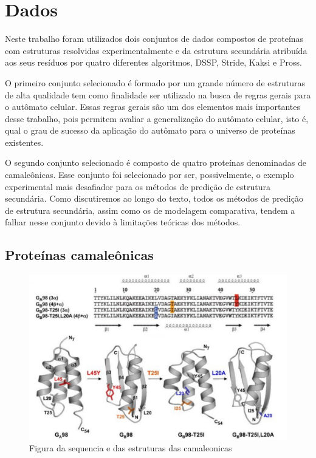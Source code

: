 \chapter{Dados}

Neste trabalho foram utilizados dois conjuntos de dados compostos de proteínas com estruturas resolvidas experimentalmente e da estrutura secundária atribuída aos seus resíduos por quatro diferentes algoritmos, DSSP, Stride, Kaksi e Pross.

O primeiro conjunto selecionado é formado por um grande número de estruturas de alta qualidade tem como finalidade ser utilizado na busca de regras gerais para o autômato celular. Essas regras gerais são um dos elementos mais importantes desse trabalho, pois permitem avaliar a generalização do autômato celular, isto é, qual o grau de sucesso da aplicação do autômato para o universo de proteínas existentes.

O segundo conjunto selecionado é composto de quatro proteínas denominadas de camaleônicas. Esse conjunto foi selecionado por ser, possivelmente, o exemplo experimental mais desafiador para os métodos de predição de estrutura secundária. Como discutiremos ao longo do texto, todos os métodos de predição de estrutura secundária, assim como os de modelagem comparativa, tendem a falhar nesse conjunto devido à limitações teóricas dos métodos.

\section{Proteínas camaleônicas}

\begin{figure}
	\centering
	\includegraphics[width=1.0\textwidth]{figures/chameleonic_resume.pdf}
	\caption{Figura da sequencia e das estruturas das camaleonicas}
\end{figure}

